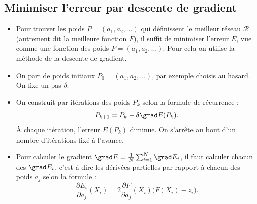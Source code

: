 \subsection{Minimiser l'erreur par descente de gradient}

\begin{itemize}
	\item Pour trouver les poids $P = (a_1,a_2,\ldots)$ qui définissent le meilleur réseau $\mathcal{R}$ (autrement dit la meilleure fonction $F$),
	il suffit de minimiser l'erreur $E$, vue comme une fonction des poids $P = (a_1,a_2,\ldots)$. Pour cela on utilise la méthode de la descente de gradient.
	
	\item On part de poids initiaux $P_0 = (a_1,a_2,\ldots)$, par exemple choisis au hasard. On fixe un pas $\delta$.
	
	\item On construit par itérations des poids $P_k$ selon la formule de récurrence :
	$$P_{k+1} = P_k - \delta \grad E(P_k).$$
	\`A chaque itération, l'erreur $E(P_k)$ diminue.
	On s'arrête au bout d'un nombre d'itérations fixé à l'avance.
	
	\item Pour calculer le gradient $\grad E = \frac 1N \sum_{i=1}^N \grad E_i$, il faut  
	calculer chacun des $\grad E_i$, c'est-à-dire les dérivées partielles par rapport à chacun des poids $a_j$ selon la formule :
	$$\frac{\partial E_i}{\partial a_j}(X_i) = 2 \frac{\partial F}{\partial a_j}(X_i)  \big( F(X_i) - z_i \big).$$
\end{itemize}  


